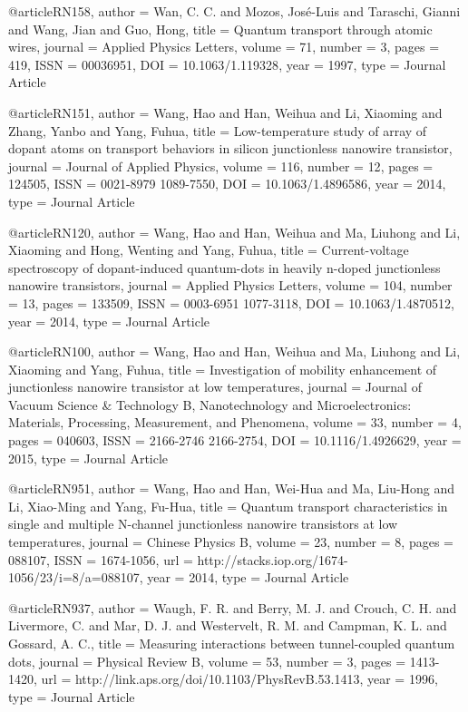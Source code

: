 @article{RN158,
   author = {Wan, C. C. and Mozos, José-Luis and Taraschi, Gianni and Wang, Jian and Guo, Hong},
   title = {Quantum transport through atomic wires},
   journal = {Applied Physics Letters},
   volume = {71},
   number = {3},
   pages = {419},
   ISSN = {00036951},
   DOI = {10.1063/1.119328},
   year = {1997},
   type = {Journal Article}
}

@article{RN151,
   author = {Wang, Hao and Han, Weihua and Li, Xiaoming and Zhang, Yanbo and Yang, Fuhua},
   title = {Low-temperature study of array of dopant atoms on transport behaviors in silicon junctionless nanowire transistor},
   journal = {Journal of Applied Physics},
   volume = {116},
   number = {12},
   pages = {124505},
   ISSN = {0021-8979
1089-7550},
   DOI = {10.1063/1.4896586},
   year = {2014},
   type = {Journal Article}
}

@article{RN120,
   author = {Wang, Hao and Han, Weihua and Ma, Liuhong and Li, Xiaoming and Hong, Wenting and Yang, Fuhua},
   title = {Current-voltage spectroscopy of dopant-induced quantum-dots in heavily n-doped junctionless nanowire transistors},
   journal = {Applied Physics Letters},
   volume = {104},
   number = {13},
   pages = {133509},
   ISSN = {0003-6951
1077-3118},
   DOI = {10.1063/1.4870512},
   year = {2014},
   type = {Journal Article}
}

@article{RN100,
   author = {Wang, Hao and Han, Weihua and Ma, Liuhong and Li, Xiaoming and Yang, Fuhua},
   title = {Investigation of mobility enhancement of junctionless nanowire transistor at low temperatures},
   journal = {Journal of Vacuum Science & Technology B, Nanotechnology and Microelectronics: Materials, Processing, Measurement, and Phenomena},
   volume = {33},
   number = {4},
   pages = {040603},
   ISSN = {2166-2746
2166-2754},
   DOI = {10.1116/1.4926629},
   year = {2015},
   type = {Journal Article}
}

@article{RN951,
   author = {Wang, Hao and Han, Wei-Hua and Ma, Liu-Hong and Li, Xiao-Ming and Yang, Fu-Hua},
   title = {Quantum transport characteristics in single and multiple N-channel junctionless nanowire transistors at low temperatures},
   journal = {Chinese Physics B},
   volume = {23},
   number = {8},
   pages = {088107},
   ISSN = {1674-1056},
   url = {http://stacks.iop.org/1674-1056/23/i=8/a=088107},
   year = {2014},
   type = {Journal Article}
}

@article{RN937,
   author = {Waugh, F. R. and Berry, M. J. and Crouch, C. H. and Livermore, C. and Mar, D. J. and Westervelt, R. M. and Campman, K. L. and Gossard, A. C.},
   title = {Measuring interactions between tunnel-coupled quantum dots},
   journal = {Physical Review B},
   volume = {53},
   number = {3},
   pages = {1413-1420},
   url = {http://link.aps.org/doi/10.1103/PhysRevB.53.1413},
   year = {1996},
   type = {Journal Article}
}

